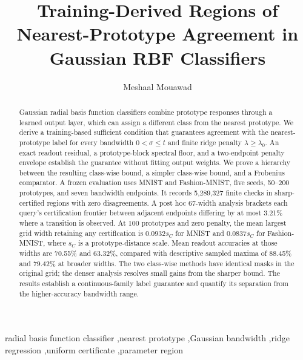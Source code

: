 \documentclass[preprint,12pt]{elsarticle}
\begin{document}
\begin{frontmatter}
\title{Training-Derived Regions of Nearest-Prototype Agreement in Gaussian RBF Classifiers}
\author[msu]{Meshaal Mouawad}
\begin{abstract}
Gaussian radial basis function classifiers combine prototype responses through a learned output layer, which can assign a different class from the nearest prototype. We derive a training-based sufficient condition that guarantees agreement with the nearest-prototype label for every bandwidth $0<\sigma\leq t$ and finite ridge penalty $\lambda\geq\lambda_0$. An exact readout residual, a prototype-block spectral floor, and a two-endpoint penalty envelope establish the guarantee without fitting output weights. We prove a hierarchy between the resulting class-wise bound, a simpler class-wise bound, and a Frobenius comparator. A frozen evaluation uses MNIST and Fashion-MNIST, five seeds, 50--200 prototypes, and seven bandwidth endpoints. It records 5,289,327 finite checks in sharp-certified regions with zero disagreements. A post hoc 67-width analysis brackets each query's certification frontier between adjacent endpoints differing by at most 3.21\% where a transition is observed. At 100 prototypes and zero penalty, the mean largest grid width retaining any certification is $0.0932s_C$ for MNIST and $0.0837s_C$ for Fashion-MNIST, where $s_C$ is a prototype-distance scale. Mean readout accuracies at those widths are 70.55\% and 63.32\%, compared with descriptive sampled maxima of 88.45\% and 79.42\% at broader widths. The two class-wise methods have identical masks in the original grid; the denser analysis resolves small gains from the sharper bound. The results establish a continuous-family label guarantee and quantify its separation from the higher-accuracy bandwidth range.
\end{abstract}
\begin{keyword}
radial basis function classifier \sep nearest prototype \sep Gaussian bandwidth \sep ridge regression \sep uniform certificate \sep parameter region
\end{keyword}
\end{frontmatter}
\end{document}
